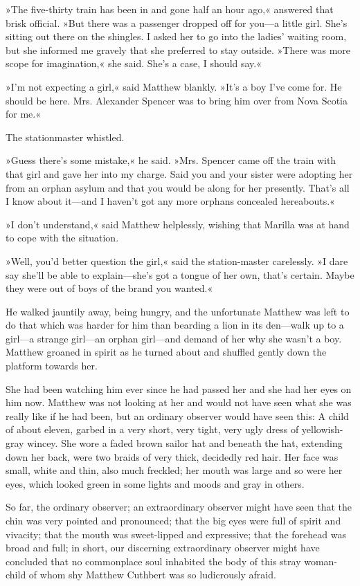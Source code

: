 »The five-thirty train has been in and gone half an hour ago,« answered that brisk official. »But there was a passenger dropped off for you—a little girl. She’s sitting out there on the shingles. I asked her to go into the ladies’ waiting room, but she informed me gravely that she preferred to stay outside. »There was more scope for imagination,« she said. She’s a case, I should say.«

»I’m not expecting a girl,« said Matthew blankly. »It’s a boy I’ve come for. He should be here. Mrs. Alexander Spencer was to bring him over from Nova Scotia for me.«

The stationmaster whistled.

»Guess there’s some mistake,« he said. »Mrs. Spencer came off the train with that girl and gave her into my charge. Said you and your sister were adopting her from an orphan asylum and that you would be along for her presently. That’s all I know about it—and I haven’t got any more orphans concealed hereabouts.«

»I don’t understand,« said Matthew helplessly, wishing that Marilla was at hand to cope with the situation.

»Well, you’d better question the girl,« said the station-master carelessly. »I dare say she’ll be able to explain—she’s got a tongue of her own, that’s certain. Maybe they were out of boys of the brand you wanted.«

He walked jauntily away, being hungry, and the unfortunate Matthew was left to do that which was harder for him than bearding a lion in its den—walk up to a girl—a strange girl—an orphan girl—and demand of her why she wasn’t a boy. Matthew groaned in spirit as he turned about and shuffled gently down the platform towards her.

She had been watching him ever since he had passed her and she had her eyes on him now. Matthew was not looking at her and would not have seen what she was really like if he had been, but an ordinary observer would have seen this: A child of about eleven, garbed in a very short, very tight, very ugly dress of yellowish-gray wincey. She wore a faded brown sailor hat and beneath the hat, extending down her back, were two braids of very thick, decidedly red hair. Her face was small, white and thin, also much freckled; her mouth was large and so were her eyes, which looked green in some lights and moods and gray in others.

So far, the ordinary observer; an extraordinary observer might have seen that the chin was very pointed and pronounced; that the big eyes were full of spirit and vivacity; that the mouth was sweet-lipped and expressive; that the forehead was broad and full; in short, our discerning extraordinary observer might have concluded that no commonplace soul inhabited the body of this stray woman-child of whom shy Matthew Cuthbert was so ludicrously afraid.

